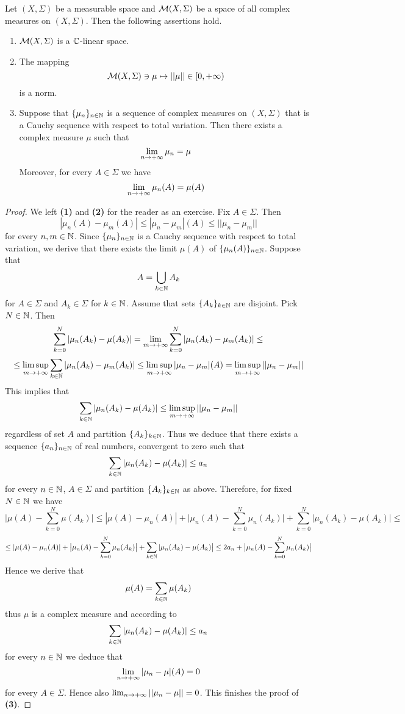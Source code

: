 \begin{theorem}\label{theorem:Banachspaceofmeasures}
Let $(X,\Sigma)$ be a measurable space and ${\mathcal M}(X,\Sigma)$ be a space of all complex measures on $(X,\Sigma)$. Then the following assertions hold.
\begin{enumerate}[label=\emph{\textbf{(\arabic*)}}, leftmargin=1.5em]
\item ${\mathcal M}(X,\Sigma)$ is a ${\mathbb C}$-linear space.
\item The mapping
$${\mathcal M}(X,\Sigma)\ni \mu \mapsto ||\mu||\in [0,+\infty)$$
is a norm.
\item Suppose that $\{\mu_n\}_{n\in {\mathbb N}}$ is a sequence of complex measures on $(X,\Sigma)$ that is a Cauchy sequence with respect to total variation. Then there exists a complex measure $\mu$ such that
$$\lim_{n\rightarrow +\infty}\mu_n = \mu$$
Moreover, for every $A\in \Sigma$ we have
$$\lim_{n\rightarrow +\infty}\mu_n(A) = \mu(A)$$
\end{enumerate}
\end{theorem}
\begin{proof}
We left \textbf{(1)} and \textbf{(2)} for the reader as an exercise. Fix $A\in \Sigma$. Then
$$|\mu_n(A) - \mu_m(A)| \leq |\mu_n - \mu_m|(A) \leq ||\mu_n - \mu_m||$$
for every $n,m\in {\mathbb N}$. Since $\{\mu_n\}_{n\in {\mathbb N}}$ is a Cauchy sequence with respect to total variation, we derive that there exists the limit $\mu(A)$ of $\{\mu_n(A)\}_{n\in {\mathbb N}}$. Suppose that
$$A = \bigcup_{k\in {\mathbb N}}A_k$$
for $A\in \Sigma$ and $A_k\in \Sigma$ for $k\in {\mathbb N}$. Assume that sets $\{A_k\}_{k \in {\mathbb N}}$ are disjoint. Pick $N\in {\mathbb N}$. Then
$$\sum_{k=0}^N|\mu_n(A_k) - \mu(A_k)| = \lim_{m\rightarrow +\infty}\sum_{k=0}^N|\mu_n(A_k) - \mu_m(A_k)| \leq$$
$$\leq \limsup_{m\rightarrow +\infty}\sum_{k\in {\mathbb N}}|\mu_n(A_k) - \mu_m(A_k)|\leq \limsup_{m\rightarrow +\infty}|\mu_n - \mu_m|(A) = \limsup_{m\rightarrow +\infty}||\mu_n - \mu_m||$$
This implies that
$$\sum_{k\in {\mathbb N}}|\mu_n(A_k) - \mu(A_k)| \leq  \limsup_{m\rightarrow +\infty}||\mu_n - \mu_m||$$
regardless of set $A$ and partition $\{A_k\}_{k\in {\mathbb N}}$. Thus we deduce that there exists a sequence $\{a_n\}_{n\in {\mathbb N}}$ of real numbers, convergent to zero such that
$$\sum_{k\in {\mathbb N}}|\mu_n(A_k) - \mu(A_k)| \leq a_n$$
for every $n\in {\mathbb N}$, $A\in \Sigma$ and partition $\{A_k\}_{k\in {\mathbb N}}$ as above. Therefore, for fixed $N\in {\mathbb N}$ we have
$$\big|\mu(A) - \sum_{k=0}^N\mu(A_k)\big| \leq |\mu(A) - \mu_n(A)| + \big|\mu_n(A) - \sum_{k=0}^N\mu_n(A_k)\big| + \sum_{k=0}^N |\mu_n(A_k) - \mu(A_k)\big| \leq $$
$$\leq |\mu(A) - \mu_n(A)| + \big|\mu_n(A) - \sum_{k=0}^N\mu_n(A_k)\big| + \sum_{k\in {\mathbb N}} |\mu_n(A_k) - \mu(A_k)\big| \leq  2a_n +  \big|\mu_n(A) - \sum_{k=0}^N\mu_n(A_k)\big|$$
Hence we derive that 
$$\mu(A) = \sum_{k\in {\mathbb N}}\mu(A_k)$$
thus $\mu$ is a complex measure and according to
$$\sum_{k\in {\mathbb N}}|\mu_n(A_k) - \mu(A_k)| \leq a_n$$
for every $n\in {\mathbb N}$ we deduce that
$$\lim_{n\rightarrow +\infty}|\mu_n - \mu|(A) = 0$$
for every $A\in \Sigma$. Hence also $\lim_{n\rightarrow +\infty}||\mu_n-\mu|| = 0$. This finishes the proof of \textbf{(3)}.
\end{proof}

